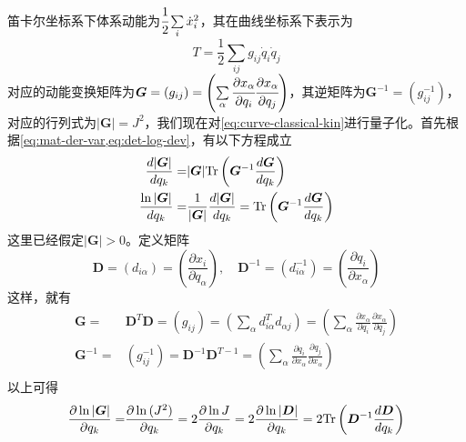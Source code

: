 \begin{note}
笛卡尔坐标系下体系动能为$\cfrac{1}{2}\sum\limits_{i} \dot{x}_i^2$，其在曲线坐标系下表示为
\begin{equation}
	T = \frac{1}{2} \sum_{ij} g_{ij} \dot{q}_i \dot{q}_j
    \label{eq:curve-classical-kin}
\end{equation}
对应的动能变换矩阵为$\bm{G} = (g_{ij}) = \left(\sum\limits_{\alpha}\cfrac{\partial x_{\alpha}}{\partial q_i}\cfrac{\partial x_{\alpha}}{\partial q_j}\right)$，其逆矩阵为$\bm{G}^{-1} = (g^{-1}_{ij})$，对应的行列式为$|\bm{G}| = J^2$，我们现在对\cref{eq:curve-classical-kin}进行量子化。首先根据\cref{eq:mat-der-var,eq:det-log-dev}，有以下方程成立
        \begin{equation*}\begin{aligned}
            \frac{d |\bm{G}|}{d q_{k}} =& 
            |\bm{G}| {\rm Tr} \left( \bm{G}^{-1} \frac{d \bm{G}}{d q_{k}} \right) \\
            \frac{\ln{|\bm{G}|}}{d q_{k}} =& \frac{1}{|\bm{G}|} \frac{d |\bm{G}|}{d q_{k}} = {\rm Tr} \left( \bm{G}^{-1} \frac{d \bm{G}}{d q_{k}} \right)
        \end{aligned}\end{equation*}
        这里已经假定$|\bm{G}| > 0$。定义矩阵
        \begin{equation*}
            \bm{D} = (d_{i\alpha}) = \left(\frac{\partial x_{i}}{\partial q_{\alpha}}\right), \quad \bm{D}^{-1} = (d^{-1}_{i\alpha}) = \left(\frac{\partial q_{i}}{\partial x_{\alpha}}\right)
        \end{equation*}
        这样，就有
        \begin{equation*}\begin{aligned}
            \bm{G} =& \bm{D}^{T}\bm{D} = (g_{ij}) = \left(\sum_{\alpha}d^{T}_{i\alpha}d_{\alpha j}\right) = \left(\sum_{\alpha}\frac{\partial x_{\alpha}}{\partial q_i}\frac{\partial x_{\alpha}}{\partial q_j}\right) \\
            \bm{G}^{-1} =& (g^{-1}_{ij}) = \bm{D}^{-1}\bm{D}^{T-1} = \left(\sum_{\alpha}\frac{\partial q_{i}}{\partial x_{\alpha}}\frac{\partial q_{j}}{\partial x_{\alpha}}\right) \\
        \end{aligned}\end{equation*}
以上可得
\begin{equation}\begin{aligned}
    \frac{\partial \ln{|\bm{G}|}}{\partial q_k} =& \frac{\partial \ln{(J^2)}}{\partial q_k} = 2 \frac{\partial \ln{J}}{\partial q_k} = 2 \frac{\partial \ln{|\bm{D}|}}{\partial q_k} =  2{\rm Tr} \left( \bm{D}^{-1} \frac{d \bm{D}}{d q_{k}} \right) \\

\end{aligned}
\end{equation}
\end{note}
